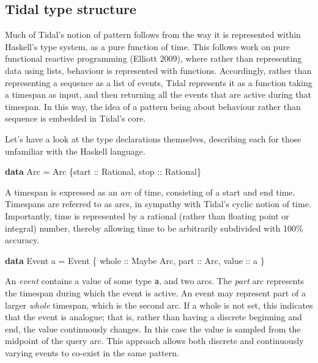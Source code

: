 \documentclass{nime-alternate} %
\newenvironment{Shaded}{\begin{snugshade}}{\end{snugshade}}
\newcommand{\DataTypeTok}[1]{\textcolor[rgb]{0.13,0.29,0.53}{#1}}
\newcommand{\KeywordTok}[1]{\textcolor[rgb]{0.13,0.29,0.53}{\textbf{#1}}}
\newcommand{\NormalTok}[1]{#1}
\newcommand{\OtherTok}[1]{\textcolor[rgb]{0.56,0.35,0.01}{#1}}
\begin{document}
\hypertarget{tidal-type-structure}{%
\subsection{Tidal type structure}\label{tidal-type-structure}}

Much of Tidal's notion of pattern follows from the way it is represented
within Haskell's type system, as a pure function of time. This follows
work on pure functional reactive programming (Elliott 2009), where
rather than representing data using lists, behaviour is represented with
functions. Accordingly, rather than representing a sequence as a list of
events, Tidal represents it as a function taking a timespan as input,
and then returning all the events that are active during that timespan.
In this way, the idea of a pattern being about behaviour rather than
sequence is embedded in Tidal's core.

Let's have a look at the type declarations themselves, describing each
for those unfamiliar with the Haskell language.

\begin{Shaded}
\begin{Highlighting}[]
\KeywordTok{data} \DataTypeTok{Arc} \OtherTok{=} \DataTypeTok{Arc}\NormalTok{ \{}\OtherTok{start ::} \DataTypeTok{Rational}\NormalTok{,}\OtherTok{ stop ::} \DataTypeTok{Rational}\NormalTok{\}}
\end{Highlighting}
\end{Shaded}

A timespan is expressed as an \emph{arc} of time, consisting of a start
and end time. Timespans are referred to as arcs, in sympathy with
Tidal's cyclic notion of time. Importantly, time is represented by a
rational (rather than floating point or integral) number, thereby
allowing time to be arbitrarily subdivided with 100\% accuracy.

\begin{Shaded}
\begin{Highlighting}[]
\KeywordTok{data} \DataTypeTok{Event}\NormalTok{ a }\OtherTok{=} \DataTypeTok{Event}\NormalTok{ \{}
\OtherTok{    whole ::} \DataTypeTok{Maybe} \DataTypeTok{Arc}\NormalTok{,}
\OtherTok{    part ::} \DataTypeTok{Arc}\NormalTok{,}
\OtherTok{    value ::}\NormalTok{ a}
\NormalTok{\}}
\end{Highlighting}
\end{Shaded}

An \emph{event} contains a value of some type \texttt{a}, and two arcs.
The \emph{part} arc represents the timespan during which the event is
active. An event may represent part of a larger \emph{whole} timespan,
which is the second arc. If a whole is not set, this indicates that the
event is analogue; that is, rather than having a discrete beginning and
end, the value continuously changes. In this case the value is sampled
from the midpoint of the query arc. This approach allows both discrete
and continuously varying events to co-exist in the same pattern.
\end{document}
